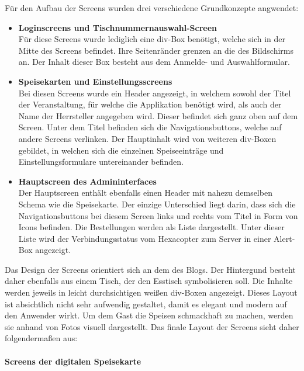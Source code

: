 Für den Aufbau der Screens wurden drei verschiedene Grundkonzepte angwendet:
\begin{itemize}
    \item \textbf{Loginscreens und Tischnummernauswahl-Screen}\\  
Für diese Screens wurde lediglich eine div-Box benötigt, welche sich in der Mitte des Screens befindet. Ihre Seitenränder grenzen an die des Bildschirms an. Der Inhalt dieser Box besteht aus dem Anmelde- und Auswahlformular.
	\item \textbf{Speisekarten und Einstellungsscreens}\\
Bei diesen Screens wurde ein Header angezeigt, in welchem sowohl der Titel der Veranstaltung, für welche die Applikation benötigt wird, als auch der Name der Herrsteller angegeben wird. Dieser befindet sich ganz oben auf dem Screen. Unter dem Titel befinden sich die Navigationsbuttons, welche auf andere Screens verlinken. Der Hauptinhalt wird von weiteren div-Boxen gebildet, in welchen sich die einzelnen Speiseeinträge und Einstellungsformulare untereinander befinden. 
    \item \textbf{Hauptscreen des Admininterfaces}\\ 
Der Hauptscreen enthält ebenfalls einen Header mit nahezu demselben Schema wie die Speisekarte. Der einzige Unterschied liegt darin, dass sich die Navigationsbuttons bei diesem Screen links und rechts vom Titel in Form von Icons befinden. Die Bestellungen werden als Liste dargestellt. Unter dieser Liste wird der Verbindungsstatus vom Hexacopter zum Server in einer Alert-Box angezeigt.
  \end{itemize}
Das Design der Screens orientiert sich an dem des Blogs. Der Hintergund besteht daher ebenfalls aus einem Tisch, der den Esstisch symbolisieren soll. Die Inhalte werden jeweils in leicht durchsichtigen weißen div-Boxen angezeigt. Dieses Layout ist absichtlich nicht sehr aufwendig gestaltet, damit es elegant und modern auf den Anwender wirkt.
Um dem Gast die Speisen schmackhaft zu machen, werden sie anhand von Fotos visuell dargestellt.
Das finale Layout der Screens sieht daher folgendermaßen aus:\\ 
\\ 
\textbf{Screens der digitalen Speisekarte}
